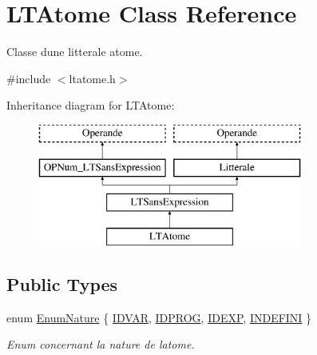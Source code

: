 \hypertarget{class_l_t_atome}{}\section{L\+T\+Atome Class Reference}
\label{class_l_t_atome}


Classe d\textquotesingle{}une litterale atome.  




{\ttfamily \#include $<$ltatome.\+h$>$}

Inheritance diagram for L\+T\+Atome\+:\begin{figure}[H]
\begin{center}
\leavevmode
\includegraphics[height=4.000000cm]{class_l_t_atome}
\end{center}
\end{figure}
\subsection*{Public Types}
\begin{DoxyCompactItemize}
\item 
enum \hyperlink{class_l_t_atome_a340480fc682a6d8fd819026d20278b49}{Enum\+Nature} \{ \hyperlink{class_l_t_atome_a340480fc682a6d8fd819026d20278b49a99911d63d6cb7a762dfeec132628ff22}{I\+D\+V\+AR}, 
\hyperlink{class_l_t_atome_a340480fc682a6d8fd819026d20278b49a56cc525550a6a682752d67bd704f834a}{I\+D\+P\+R\+OG}, 
\hyperlink{class_l_t_atome_a340480fc682a6d8fd819026d20278b49a192a6fae9192e3a133b23f9939bcebd3}{I\+D\+E\+XP}, 
\hyperlink{class_l_t_atome_a340480fc682a6d8fd819026d20278b49a841226cd2ef78fa4c11c33180b05103e}{I\+N\+D\+E\+F\+I\+NI}
 \}\begin{DoxyCompactList}\small\item\em Enum concernant la nature de l\textquotesingle{}atome. \end{DoxyCompactList}
\end{DoxyCompactItemize}
